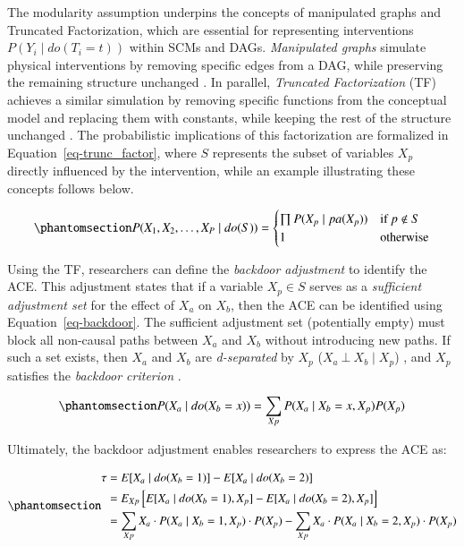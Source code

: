 \documentclass[
  authoryear,
  review,
  1p]{elsarticle}
\begin{document}
The modularity assumption underpins the concepts of manipulated graphs
and Truncated Factorization, which are essential for representing
interventions \(P(Y_{i} \mid do(T_{i}=t))\) within SCMs and DAGs.
\emph{Manipulated graphs} simulate physical interventions by removing
specific edges from a DAG, while preserving the remaining structure
unchanged \citep[pp.~34]{Neal_2020}. In parallel, \emph{Truncated
Factorization} (TF) achieves a similar simulation by removing specific
functions from the conceptual model and replacing them with constants,
while keeping the rest of the structure unchanged \citep{Pearl_2010}.
The probabilistic implications of this factorization are formalized in
Equation~\ref{eq-trunc_factor}, where \(S\) represents the subset of
variables \(X_{p}\) directly influenced by the intervention, while an
example illustrating these concepts follows below.

\begin{equation}\phantomsection\label{eq-trunc_factor}{
P(X_{1}, X_{2}, \dots, X_{P} \mid do(S)) =
\begin{cases}
  \prod P(X_{p} \mid pa(X_{p}) ) & \text{if} \: p \not\in S \\
  1 \quad & \text{otherwise}
\end{cases}
}\end{equation}

Using the TF, researchers can define the \emph{backdoor adjustment} to
identify the ACE. This adjustment states that if a variable
\(X_{p} \in S\) serves as a \emph{sufficient adjustment set} for the
effect of \(X_{a}\) on \(X_{b}\), then the ACE can be identified using
Equation~\ref{eq-backdoor}. The sufficient adjustment set (potentially
empty) must block all non-causal paths between \(X_{a}\) and \(X_{b}\)
without introducing new paths. If such a set exists, then \(X_{a}\) and
\(X_{b}\) are \emph{d-separated} by \(X_{p}\)
(\(X_{a} \:\bot\:X_{b} \mid X_{p}\)) \citep{Pearl_2009}, and \(X_{p}\)
satisfies the \emph{backdoor criterion} \citep[pp.~37]{Neal_2020}.

\begin{equation}\phantomsection\label{eq-backdoor}{
P(X_{a} \mid do(X_{b}=x)) = \sum_{Xp} P(X_{a} \mid X_{b}=x, X_{p}) P(X_{p})
}\end{equation}

Ultimately, the backdoor adjustment enables researchers to express the
ACE as:

\begin{equation}\phantomsection\label{eq-backdoor_adjustment}{
\begin{aligned}
\tau & = E[X_{a} \mid do(X_{b}=1)]- E[X_{a} \mid do(X_{b}=2)] \\
  & = E_{Xp}\left[ E[X_{a} \mid do(X_{b}=1), X_{p}]- E[X_{a} \mid do(X_{b}=2), X_{p}] \right] \\
  & = \sum_{Xp} X_{a} \cdot P(X_{a} \mid X_{b}=1, X_{p}) \cdot P(X_{p}) - \sum_{Xp} X_{a} \cdot P(X_{a} \mid X_{b}=2, X_{p}) \cdot P(X_{p})
\end{aligned}
}\end{equation}
\end{document}
